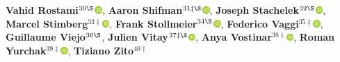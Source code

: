 \textbf{Vahid Rostami}$^{30\S}$\href{http://orcid.org/0000-0002-3851-0220}{\includegraphics[width=8pt]{orcid}},
\textbf{Aaron Shifman}$^{31\ddagger\S}$\href{http://orcid.org/0000-0003-2140-7590}{\includegraphics[width=8pt]{orcid}},
\textbf{Joseph Stachelek}$^{32\S}$\href{http://orcid.org/0000-0002-5924-2464}{\includegraphics[width=8pt]{orcid}},
\textbf{Marcel Stimberg}$^{33\ddagger}$\href{http://orcid.org/0000-0002-2648-4790}{\includegraphics[width=8pt]{orcid}},
\textbf{Frank Stollmeier}$^{34\S}$\href{http://orcid.org/0000-0003-4858-0895}{\includegraphics[width=8pt]{orcid}},
\textbf{Federico Vaggi}$^{35\ddagger}$\href{http://orcid.org/0000-0001-8100-158X}{\includegraphics[width=8pt]{orcid}},
\textbf{Guillaume Viejo}$^{36\S}$,
\textbf{Julien Vitay}$^{37\ddagger\S}$\href{http://orcid.org/0000-0001-5229-2349}{\includegraphics[width=8pt]{orcid}},
\textbf{Anya Vostinar}$^{38\ddagger}$\href{http://orcid.org/0000-0001-7216-5283}{\includegraphics[width=8pt]{orcid}},
\textbf{Roman Yurchak}$^{39\ddagger}$\href{http://orcid.org/0000-0002-2565-4444}{\includegraphics[width=8pt]{orcid}},
\textbf{Tiziano Zito}$^{40\dagger}$\\

